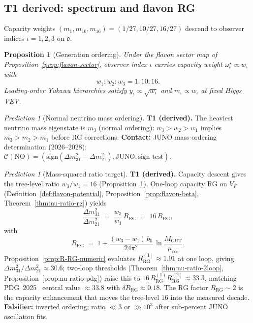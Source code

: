 \documentclass[aps,prd,onecolumn,amsmath,amssymb,nofootinbib,11pt]{revtex4-2}
\numberwithin{equation}{section}
\theoremstyle{plain}
\newtheorem{proposition}[theorem]{Proposition}
\theoremstyle{definition}
\theoremstyle{remark}
\newtheorem{prediction}[theorem]{Prediction}
\begin{document}
\subsection{T1 derived: spectrum and flavon RG}
\label{sec:predictions:T1-derived-spectrum}

Capacity weights $(m_1,m_{10},m_{16})=(1/27,10/27,16/27)$ descend to observer
indices $\iota=1,2,3$ on $\mathfrak{d}$.

\begin{proposition}[Generation ordering]\label{prop:gen-ordering}
Under the flavon sector map of Proposition~\ref{prop:flavon-sector}, observer
index $\iota$ carries capacity weight $\omega^\star_\iota\propto w_\iota$ with
\begin{equation}\label{eq:capacity-weights}
  w_1:w_2:w_3 = 1:10:16.
\end{equation}
Leading-order Yukawa hierarchies satisfy $y_\iota\propto\sqrt{w_\iota}$ and
$m_\iota\propto w_\iota$ at fixed Higgs VEV.
\end{proposition}

\begin{prediction}[Normal neutrino mass ordering]\label{pred:nu-ordering}
\textbf{T1 (derived).} The heaviest neutrino mass eigenstate is $m_3$ (normal ordering):
$w_3>w_2>w_1$ implies $m_3>m_2>m_1$ before RG corrections.
\textbf{Contact:} JUNO mass-ordering determination (2026--2028);
$\mathcal{C}(\text{NO})=(\text{sign}(\Delta m^2_{31}-\Delta m^2_{21}),
\mathrm{JUNO},\text{sign test})$.
\end{prediction}

\begin{prediction}[Mass-squared ratio target]\label{pred:nu-ratio}
\textbf{T1 (derived).} Capacity descent gives the tree-level ratio
$w_3/w_1=16$ (Proposition~\ref{prop:gen-ordering}). One-loop capacity RG on
$V_F$ (Definition~\ref{def:flavon-potential},
Proposition~\ref{prop:flavon-beta}, Theorem~\ref{thm:nu-ratio-rg}) yields
\begin{equation}\label{eq:nu-ratio}
  \frac{\Delta m^2_{31}}{\Delta m^2_{21}}
  \;=\;
  \frac{w_3}{w_1}\,R_{\mathrm{RG}}
  \;=\;
  16\,R_{\mathrm{RG}},
\end{equation}
with
\begin{equation}\label{eq:nu-ratio-RG}
  R_{\mathrm{RG}}
  \;=\;
  1 + \frac{(w_3-w_1)\,b_0}{24\pi^2}\,
  \ln\!\frac{M_{\mathrm{GUT}}}{\mu_{\mathrm{osc}}}.
\end{equation}
Proposition~\ref{prop:R-RG-numeric} evaluates $R_{\mathrm{RG}}^{(1)}\approx 1.91$
at one loop, giving $\Delta m^2_{31}/\Delta m^2_{21}\approx 30.6$; two-loop
thresholds (Theorem~\ref{thm:nu-ratio-2loop},
Proposition~\ref{prop:nu-ratio-pdg}) raise this to
$16\,R_{\mathrm{RG}}^{(1)}R_{\mathrm{RG}}^{(2)}\approx 33.3$, matching
PDG~2025~\cite{PDG2025} central value $\approx 33.8$ with
$\delta R_{\mathrm{RG}}\approx 0.18$. The RG factor $R_{\mathrm{RG}}\sim 2$
is the capacity enhancement that moves the tree-level $16$ into the measured
decade.
\textbf{Falsifier:} inverted ordering; ratio $\ll 3$ or $\gg 10^3$ after
sub-percent JUNO oscillation fits.
\end{prediction}
\end{document}
